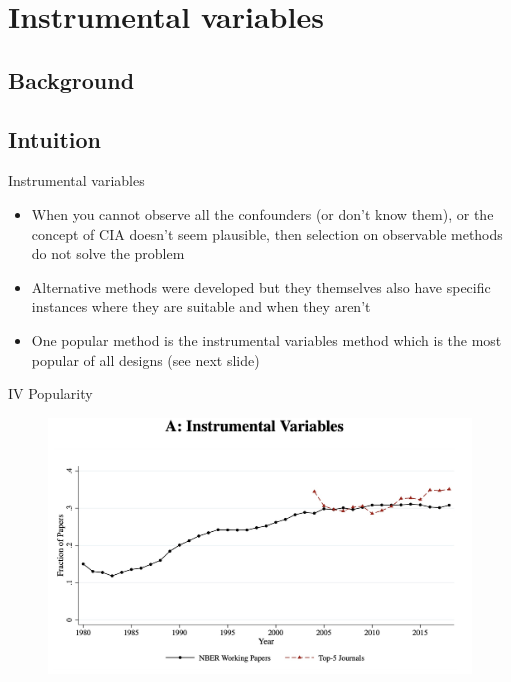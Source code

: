 \documentclass{beamer}
\begin{document}



\section{Instrumental variables}

\subsection{Background}
\subsection{Intuition}

\begin{frame}{Instrumental variables}

\begin{itemize}
\item When you cannot observe all the confounders (or don't know them), or the concept of CIA doesn't seem plausible, then selection on observable methods do not solve the problem
\item Alternative methods were developed but they themselves also have specific instances where they are suitable and when they aren't
\item One popular method is the instrumental variables method which is the most popular of all designs (see next slide)
\end{itemize}

\end{frame}

\begin{frame}{IV Popularity}

	\begin{figure}
	\includegraphics[scale=.15]{./lecture_includes/currie_iv}
	\end{figure}
	
\end{frame}
\end{document}
